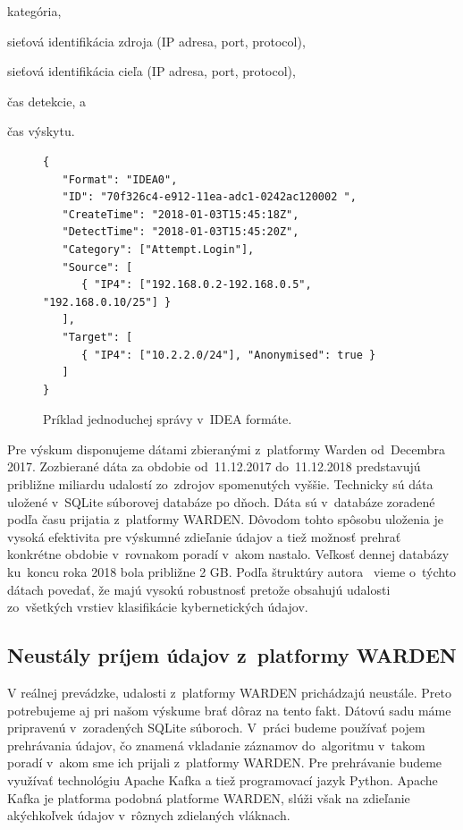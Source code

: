 \documentclass[thesismargins, thesislinespacing, openright, upjsfrontpage]{rnthesis}
\begin{document}
\begin{compactenum}
\item kategória, 
\item sieťová identifikácia zdroja (IP adresa, port, protocol), 
\item sieťová identifikácia cieľa (IP adresa, port, protocol), 
\item čas detekcie, a
\item čas výskytu.
\end{compactenum}

\begin{figure}
    \begin{lstlisting}[]  
{
   "Format": "IDEA0",
   "ID": "70f326c4-e912-11ea-adc1-0242ac120002 ",
   "CreateTime": "2018-01-03T15:45:18Z",
   "DetectTime": "2018-01-03T15:45:20Z",
   "Category": ["Attempt.Login"],
   "Source": [
      { "IP4": ["192.168.0.2-192.168.0.5", "192.168.0.10/25"] }
   ],
   "Target": [
      { "IP4": ["10.2.2.0/24"], "Anonymised": true }
   ]
}
    \end{lstlisting}
    
    \caption{Príklad jednoduchej správy v~IDEA formáte.}
    \label{alg:idea}
\end{figure}

Pre výskum disponujeme dátami zbieranými z~platformy Warden od~Decembra 2017. Zozbierané dáta za obdobie od~11.12.2017 do~11.12.2018 predstavujú približne miliardu udalostí zo~zdrojov spomenutých vyššie. Technicky sú dáta uložené v~SQLite súborovej databáze po dňoch. Dáta sú v~databáze zoradené podľa času prijatia z~platformy WARDEN. Dôvodom tohto spôsobu uloženia je vysoká efektivita pre výskumné zdieľanie údajov a tiež možnosť prehrať konkrétne obdobie v~rovnakom poradí v~akom nastalo. Veľkosť dennej databázy ku~koncu roka 2018 bola približne 2 GB. Podľa štruktúry autora~\cite{wang2013cyber} vieme o~týchto dátach povedať, že majú vysokú robustnosť pretože obsahujú udalosti zo~všetkých vrstiev klasifikácie kybernetických údajov.

\subsection{Neustály príjem údajov z~platformy WARDEN}

V reálnej prevádzke, udalosti z~platformy WARDEN prichádzajú neustále. Preto potrebujeme aj pri našom výskume brať dôraz na tento fakt. Dátovú sadu máme pripravenú v~zoradených SQLite súboroch. V~práci budeme používať pojem prehrávania údajov, čo znamená vkladanie záznamov do~algoritmu v~takom poradí v~akom sme ich prijali z~platformy WARDEN. Pre prehrávanie budeme využívať technológiu Apache Kafka a tiež programovací jazyk Python. Apache Kafka je platforma podobná platforme WARDEN, slúži však na zdieľanie akýchkoľvek údajov v~rôznych zdielaných vláknach. 
\end{document}
